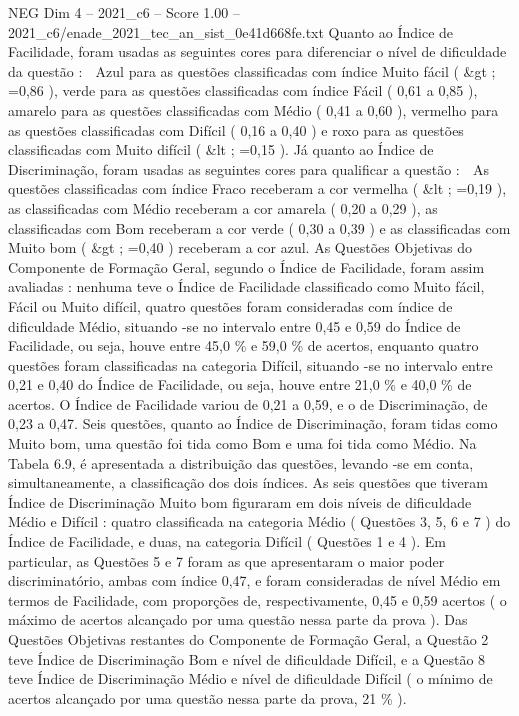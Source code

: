 \begin{textsample}{NEG Dim 4 – 2021\_c6 – Score 1.00 – 2021\_c6/enade\_2021\_tec\_an\_sist\_0e41d668fe.txt}
Quanto ao Índice de Facilidade, foram usadas as seguintes cores para diferenciar o nível de dificuldade da questão :  Azul para as questões classificadas com índice Muito fácil ( \&gt ; =0,86 ), verde para as questões classificadas com índice Fácil ( 0,61 a 0,85 ), amarelo para as questões classificadas com Médio ( 0,41 a 0,60 ), vermelho para as questões classificadas com Difícil ( 0,16 a 0,40 ) e roxo para as questões classificadas com Muito difícil ( \&lt ; =0,15 ).
Já quanto ao Índice de Discriminação, foram usadas as seguintes cores para qualificar a questão :  As questões classificadas com índice Fraco receberam a cor vermelha ( \&lt ; =0,19 ), as classificadas com Médio receberam a cor amarela ( 0,20 a 0,29 ), as classificadas com Bom receberam a cor verde ( 0,30 a 0,39 ) e as classificadas com Muito bom ( \&gt ; =0,40 ) receberam a cor azul.
As Questões Objetivas do Componente de Formação Geral, segundo o Índice de Facilidade, foram assim avaliadas : nenhuma teve o Índice de Facilidade classificado como Muito fácil, Fácil ou Muito difícil, quatro questões foram consideradas com índice de dificuldade Médio, situando -se no intervalo entre 0,45 e 0,59 do Índice de Facilidade, ou seja, houve entre 45,0 \% e 59,0 \% de acertos, enquanto quatro questões foram classificadas na categoria Difícil, situando -se no intervalo entre 0,21 e 0,40 do Índice de Facilidade, ou seja, houve entre 21,0 \% e 40,0 \% de acertos.
O Índice de Facilidade variou de 0,21 a 0,59, e o de Discriminação, de 0,23 a 0,47.
Seis questões, quanto ao Índice de Discriminação, foram tidas como Muito bom, uma questão foi tida como Bom e uma foi tida como Médio.
Na Tabela 6.9, é apresentada a distribuição das questões, levando -se em conta, simultaneamente, a classificação dos dois índices.
As seis questões que tiveram Índice de Discriminação Muito bom figuraram em dois níveis de dificuldade Médio e Difícil : quatro classificada na categoria Médio ( Questões 3, 5, 6 e 7 ) do Índice de Facilidade, e duas, na categoria Difícil ( Questões 1 e 4 ).
Em particular, as Questões 5 e 7 foram as que apresentaram o maior poder discriminatório, ambas com índice 0,47, e foram consideradas de nível Médio em termos de Facilidade, com proporções de, respectivamente, 0,45 e 0,59 acertos ( o máximo de acertos alcançado por uma questão nessa parte da prova ).
Das Questões Objetivas restantes do Componente de Formação Geral, a Questão 2 teve Índice de Discriminação Bom e nível de dificuldade Difícil, e a Questão 8 teve Índice de Discriminação Médio e nível de dificuldade Difícil ( o mínimo de acertos alcançado por uma questão nessa parte da prova, 21 \% ).

\end{textsample}
